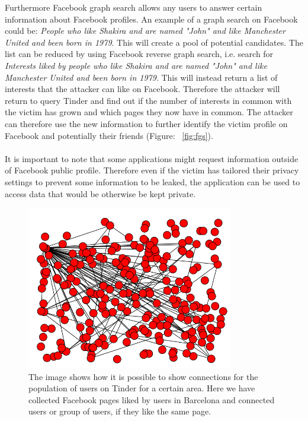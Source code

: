 Furthermore Facebook graph search allows any users to answer certain information about Facebook profiles. An example of a graph search on Facebook could be: \emph{People who like Shakira and are named "John" and like Manchester United and been born in 1979}. This will create a pool of potential candidates. The list can be reduced by using Facebook reverse graph search, i.e. search for \emph{Interests liked by people who like Shakira and are named "John" and like Manchester United and been born in 1979}.  This will instead return a list of interests that the attacker can like on Facebook. Therefore the attacker will return to query Tinder and find out if the number of interests in common with the victim has grown and which pages they now have in common. The attacker can therefore use the new information to further identify the victim profile on Facebook and potentially their friends (Figure: ~\ref{fig:fgs}).\\
\\
\noindent
It is important to note that some applications might request information outside of Facebook public profile. Therefore even if the victim has tailored their privacy settings to prevent some information to be leaked, the application can be used to access data that would be otherwise be kept private.

\begin{figure}[t]
\centering
\includegraphics[width=90mm]{figures/figure_connections.png}
\caption[Facebook pages likes by Tinder users.]{The image shows how it is possible to show connections for the population of users on Tinder for a certain area. Here we have collected Facebook pages liked by users in Barcelona and connected users or group of users, if they like the same page.\label{fig:connections}}
\end{figure}

